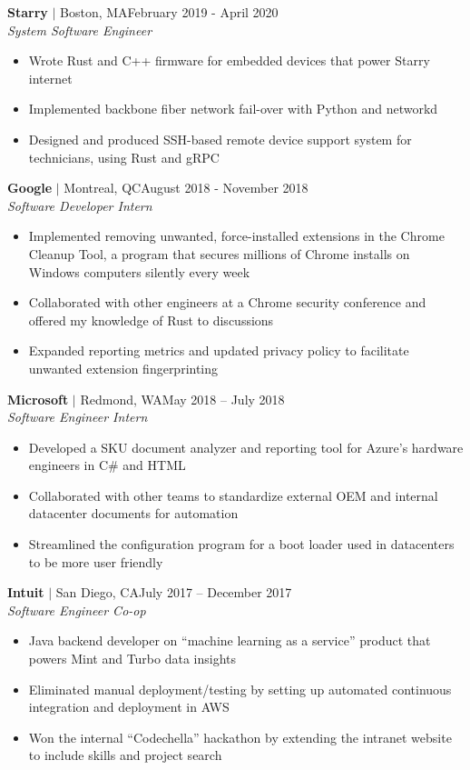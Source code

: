 \documentclass[overlapped,line]{res}
\begin{document}
\begin{resume}
\textbf{Starry} $|$ Boston, MA\hfill February 2019 - April 2020\\
{\sl System Software Engineer}
\begin{itemize} \itemsep -2pt
    \item Wrote Rust and C++ firmware for embedded devices that power Starry internet
    \item Implemented backbone fiber network fail-over with Python and networkd
    \item Designed and produced SSH-based remote device support system for technicians, using Rust and gRPC
\end{itemize}

\textbf{Google} $|$ Montreal, QC\hfill August 2018 - November 2018\\
{\sl Software Developer Intern}
\begin{itemize} \itemsep -2pt
	\item Implemented removing unwanted, force-installed extensions in the Chrome Cleanup Tool, a program that secures millions of Chrome installs on Windows computers silently every week
    \item Collaborated with other engineers at a Chrome security conference and
      offered my knowledge of Rust to discussions
    \item Expanded reporting metrics and updated privacy policy to facilitate unwanted extension fingerprinting
\end{itemize}

\textbf{Microsoft} $|$ Redmond, WA\hfill May 2018 \--- July 2018\\
{\sl Software Engineer Intern}
\begin{itemize} \itemsep -2pt
	\item Developed a SKU document analyzer and reporting tool for Azure's hardware engineers in C\# and HTML
	\item Collaborated with other teams to standardize external OEM and internal datacenter documents for automation
	\item Streamlined the configuration program for a boot loader used in datacenters to be more user friendly
\end{itemize}

\textbf{Intuit} $|$ San Diego, CA\hfill July 2017 \--- December 2017\\
{\sl Software Engineer Co-op}
\begin{itemize} \itemsep -2pt
	\item Java backend developer on ``machine learning as a service'' product that powers Mint and Turbo data insights
	\item Eliminated manual deployment/testing by setting up automated
      continuous integration and deployment in AWS
	\item Won the internal ``Codechella'' hackathon by extending the intranet website to include skills and project search
\end{itemize}


\end{resume}
\end{document}
